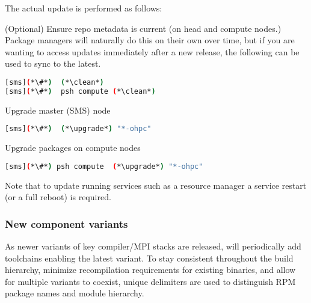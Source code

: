 The actual update is performed as follows:
\begin{enumerate*}
\item (Optional) Ensure repo metadata is current (on head and compute nodes.)
  Package managers will naturally do this on their own over time,
  but if you are wanting to access updates immediately after a new release,
  the following can be used to sync to the latest.

\begin{lstlisting}[language=bash,keywords={}]
[sms](*\#*)  (*\clean*)
[sms](*\#*)  psh compute (*\clean*)
\end{lstlisting}

\item Upgrade master (SMS) node

\begin{lstlisting}[language=bash,keywords={}]
[sms](*\#*)  (*\upgrade*) "*-ohpc"
\end{lstlisting}
  
\item Upgrade packages on compute nodes

\begin{lstlisting}[language=bash,keywords={}]
[sms](*\#*) psh compute  (*\upgrade*) "*-ohpc"
\end{lstlisting}
  

\end{enumerate*}

\noindent Note that to update running services such as a resource manager a
service restart (or a full reboot) is required.

\subsubsection{New component variants}

As newer variants of key compiler/MPI stacks are released, \OHPC{} will
periodically add toolchains enabling the latest variant. To stay consistent
throughout the build hierarchy, minimize recompilation requirements for existing
binaries, and allow for multiple variants to coexist, unique delimiters are
used to distinguish RPM package names and module hierarchy.

